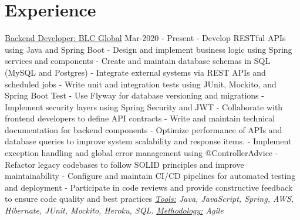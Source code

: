 \documentclass[letterpaper]{twentysecondcv} %
\begin{document}
\section{Experience}
\newline\newline 
{\large\underline{Backend Developer: BLC Global}}  \hspace*{105pt}  Mar-2020 - Present
\newline\newline
    \newline- Develop RESTful APIs using Java and Spring Boot
    \newline- Design and implement business logic using Spring services and components
    \newline- Create and maintain database schemas in SQL (MySQL and Postgres)
    \newline- Integrate external systems via REST APIs and scheduled jobs
    \newline- Write unit and integration tests using JUnit, Mockito, and Spring Boot Test
    \newline- Use Flyway for database versioning and migrations
    \newline- Implement security layers using Spring Security and JWT
    \newline- Collaborate with frontend developers to define API contracts
    \newline- Write and maintain technical documentation for backend components
    \newline- Optimize performance of APIs and database queries to improve system scalability and response items.
    \newline- Implement exception handling and global error management using @ControllerAdvice
    \newline- Refactor legacy codebases to follow SOLID principles and improve maintainability
    \newline- Configure and maintain CI/CD pipelines for automated testing and deployment
    \newline- Participate in code reviews and provide constructive feedback to ensure code quality and best practices
    \newline\newline\textit{\underline{Tools:} Java, JavaScript, Spring, AWS, Hibernate, JUnit, Mockito, Heroku, SQL.}
    \newline\newline\textit{\underline{Methodology:} Agile}
    \newline\newline\newline\newline\newline\newline
\end{document}
